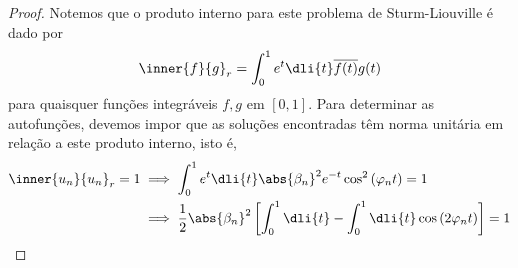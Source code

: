 \begin{proof}
    Notemos que o produto interno para este problema de Sturm-Liouville é dado por
    \begin{equation*}
        \inner{f}{g}_r = \int_{0}^{1} e^{t}\dli{t}\overline{f(t)}g(t)
    \end{equation*}
    para quaisquer funções integráveis \(f, g\) em \([0,1]\). Para determinar as autofunções, devemos impor que as soluções encontradas têm norma unitária em relação a este produto interno, isto é,
    \begin{align*}
        \inner{u_n}{u_n}_r = 1 &\implies \int_0^1 e^t \dli{t} \abs{\beta_n}^2 e^{-t}\cos^2\left(\varphi_n t\right) = 1\\
                               &\implies  \frac12\abs{\beta_n}^2 \left[\int_0^1 \dli{t} - \int_0^1 \dli{t} \cos\left(2\varphi_n t\right)\right] = 1
    \end{align*}
\end{proof}
